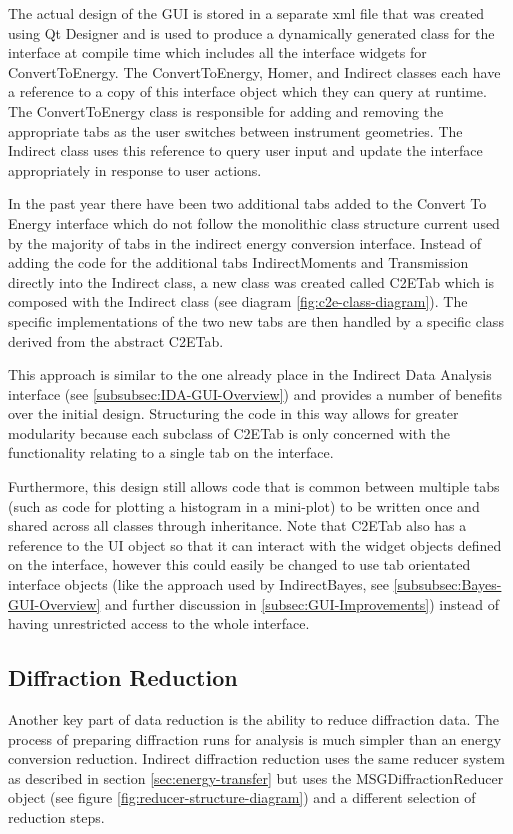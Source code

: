 \documentclass[paper=a4, fontsize=11pt]{scrartcl}	%
\numberwithin{equation}{section}															%
\numberwithin{figure}{section}																%
\numberwithin{table}{section}																%
\begin{document}
The actual design of the GUI is stored in a separate xml file that was created using Qt Designer and is used to produce a dynamically generated class for the interface at compile time which includes all the interface widgets for ConvertToEnergy. The ConvertToEnergy, Homer, and Indirect classes each have a reference to a copy of this interface object which they can query at runtime. The ConvertToEnergy class is responsible for adding and removing the appropriate tabs as the user switches between instrument geometries. The Indirect class uses this reference to query user input and update the interface appropriately in response to user actions.

In the past year there have been two additional tabs added to the Convert To Energy interface which do not follow the monolithic class structure current used by the majority of tabs in the indirect energy conversion interface. Instead of adding the code for the additional tabs IndirectMoments and Transmission directly into the Indirect class, a new class was created called C2ETab which is composed with the Indirect class (see diagram \ref{fig:c2e-class-diagram}). The specific implementations of the two new tabs are then handled by a specific class derived from the abstract C2ETab.

This approach is similar to the one already place in the Indirect Data Analysis interface (see \ref{subsubsec:IDA-GUI-Overview}) and provides a number of benefits over the initial design. Structuring the code in this way allows for greater modularity because each subclass of C2ETab is only concerned with the functionality relating to a single tab on the interface.

Furthermore, this design still allows code that is common between multiple tabs (such as code for plotting a histogram in a mini-plot) to be written once and shared across all classes through inheritance. Note that C2ETab also has a reference to the UI object so that it can interact with the widget objects defined on the interface, however this could easily be changed to use tab orientated interface objects (like the approach used by IndirectBayes, see \ref{subsubsec:Bayes-GUI-Overview} and further discussion in \ref{subsec:GUI-Improvements}) instead of having unrestricted access to the whole interface.

\subsection{Diffraction Reduction}
\label{subsec:indirect-diffraction}
Another key part of data reduction is the ability to reduce diffraction data. The process of preparing diffraction runs for analysis is much simpler than an energy conversion reduction. Indirect diffraction reduction uses the same reducer system as described in section \ref{sec:energy-transfer} but uses the MSGDiffractionReducer object (see figure \ref{fig:reducer-structure-diagram}) and a different selection of reduction steps. 
\end{document}
